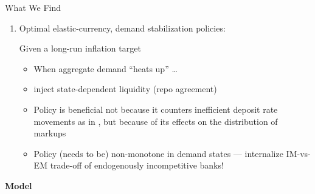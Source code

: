 \documentclass[10pt,english,slidetop,compress,
              blue,mathserif,color=option]{beamer}
\theoremstyle{plain}
\theoremstyle{definition}
\begin{document}
\begin{frame}[allowframebreaks]{What We Find}
\begin{enumerate}
        

      \break

    \item \alert{Optimal elastic-currency, demand stabilization policies}:
    
      Given a long-run inflation target
      \begin{itemize}
        \item When aggregate demand ``heats up'' \dots
        \item inject state-dependent liquidity (repo agreement)
        \item Policy is beneficial not because it counters inefficient deposit rate movements as in \citet{Berentsen-Waller2011}, but because of its effects on the distribution of markups
        \item Policy (needs to be) non-monotone in demand states --- internalize IM-vs-EM trade-off of endogenously incompetitive banks!
      \end{itemize}
  \end{enumerate}
\end{frame}



{
  \begin{frame}
    \begin{center}
      \bigskip
      \bigskip

      {\Huge\bfseries{\color{orange}Model}}
      \bigskip

    \end{center}
  \end{frame}
}
\end{document}
